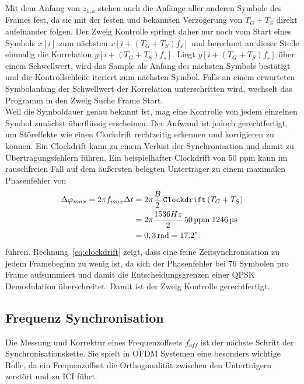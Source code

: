 Mit dem Anfang von $z_{1,k}$ stehen auch die Anfänge aller anderen Symbole des Frames fest, da sie mit der festen und bekannten Verzögerung von $T_G+T_S$ direkt aufeinander folgen. Der Zweig \glqq Kontrolle\grqq{} springt daher nur noch vom Start eines Symbols $x[i]$ zum nächsten $x[i+(T_G+T_S)f_s]$ und berechnet an dieser Stelle einmalig die Korrelation $y[i+(T_G+T_S)f_s]$. Liegt $y[i+(T_G+T_S)f_s]$ über einem Schwellwert, wird das Sample als Anfang des nächsten Symbols bestätigt und die Kontrollschleife iteriert zum nächsten Symbol. Falls an einem erwarteten Symbolanfang der Schwellwert der Korrelation unterschritten wird, wechselt das Programm in den Zweig \glqq Suche Frame Start\grqq{}.\\

Weil die Symboldauer genau bekannt ist, mag eine Kontrolle von jedem einzelnen Symbol zunächst überflüssig erscheinen. Der Aufwand ist jedoch gerechtfertigt, um Störeffekte wie einen Clockdrift rechtzeitig erkennen und korrigieren zu können. Ein Clockdrift kann zu einem Verlust der Synchronisation und damit zu Übertragungsfehlern führen.
Ein beispielhafter Clockdrift von 50 ppm kann im rauschfreien Fall auf dem äußersten belegten Unterträger zu einem maximalen Phasenfehler von
\begin{equation}
\begin{aligned}
    \Delta\varphi_{max} = 2 \pi f_{max} \Delta t &= 2 \pi \frac{B}{2}\, \texttt{Clockdrift}\, (T_G+T_S) \\
    &=  2 \pi \frac{1536 Hz}{2}\, 50\, \text{ppm}\; 1246\, \text{\textmu s} \\
    &= 0,3\, \text{rad} = \ang{17,2}
    \end{aligned}
    \label{eq:clockdrift}
\end{equation}
führen. Rechnung~\ref{eq:clockdrift} zeigt, dass eine feine Zeitsynchronisation zu jedem Framebeginn zu wenig ist, da sich der Phasenfehler bei 76 Symbolen pro Frame aufsummiert und damit die Entscheidungsgrenzen einer QPSK Demodulation überschreitet. Damit ist der Zweig \glqq Kontrolle\grqq{} gerechtfertigt.


\subsection{Frequenz Synchronisation}
Die Messung und Korrektur eines Frequenzoffsets $f_{off}$ ist der nächste Schritt der Synchronisationskette. Sie spielt in OFDM Systemen eine besonders wichtige Rolle, da ein Frequenzoffset die Orthogonalität zwischen den Unterträgern zerstört und zu \ac{ICI} führt.

